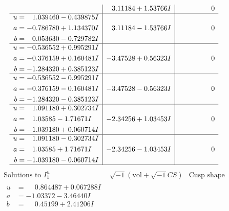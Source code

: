 \documentclass[1p]{elsarticle_modified}
\theoremstyle{definition}
\newcommand{\I}{\sqrt{-1}}
\begin{document}
$$\begin{array}{c|c|c}
 & \phantom{-}3.11184 + 1.53766 I & \phantom{-0.000000 } 0 \\ \hline\begin{aligned}
u &= \phantom{-}1.039460 - 0.439875 I \\
a &= -0.786780 + 1.134370 I \\
b &= \phantom{-}0.053630 - 0.729782 I\end{aligned}
 & \phantom{-}3.11184 - 1.53766 I & \phantom{-0.000000 } 0 \\ \hline\begin{aligned}
u &= -0.536552 + 0.995291 I \\
a &= -0.376159 + 0.160481 I \\
b &= -1.284320 + 0.385123 I\end{aligned}
 & -3.47528 + 0.56323 I & \phantom{-0.000000 } 0 \\ \hline\begin{aligned}
u &= -0.536552 - 0.995291 I \\
a &= -0.376159 - 0.160481 I \\
b &= -1.284320 - 0.385123 I\end{aligned}
 & -3.47528 - 0.56323 I & \phantom{-0.000000 } 0 \\ \hline\begin{aligned}
u &= \phantom{-}1.091180 + 0.302734 I \\
a &= \phantom{-}1.03585 - 1.71671 I \\
b &= -1.039180 + 0.060714 I\end{aligned}
 & -2.34256 + 1.03453 I & \phantom{-0.000000 } 0 \\ \hline\begin{aligned}
u &= \phantom{-}1.091180 - 0.302734 I \\
a &= \phantom{-}1.03585 + 1.71671 I \\
b &= -1.039180 - 0.060714 I\end{aligned}
 & -2.34256 - 1.03453 I & \phantom{-0.000000 } 0\\
 \hline 
 \end{array}$$\newpage$$\begin{array}{c|c|c}  
\text{Solutions to }I^u_{1}& \I (\text{vol} + \sqrt{-1}CS) & \text{Cusp shape}\\
 \hline 
\begin{aligned}
u &= \phantom{-}0.864487 + 0.067288 I \\
a &= -1.03372 - 3.46440 I \\
b &= \phantom{-}0.45199 + 2.41206 I\end{aligned}

\end{array}$$
\end{document}

